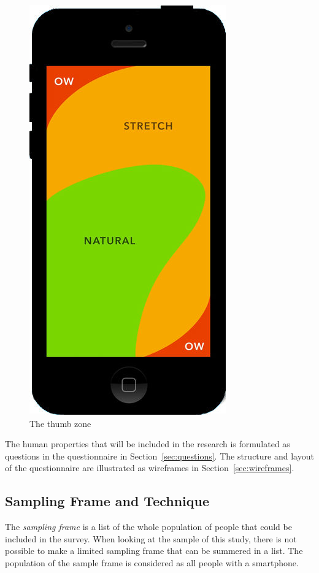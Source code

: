       \begin{figure}[H]
          \centering
          \includegraphics[scale=0.20]{pics/mobileScreen.jpg}
          \caption{The thumb zone}
          \label{fig:thumbZone}
        \end{figure}


    The human properties that will be included in the research is formulated as questions in the questionnaire in Section~\ref{sec:questions}. The structure and layout of the questionnaire are illustrated as wireframes in Section~\ref{sec:wireframes}.
    
    \subsection{Sampling Frame and Technique} \label{sec:sampling}
      
    The {\it sampling frame} is a list of the whole population of people that could be included in the survey. When looking at the sample of this study, there is not possible to make a limited sampling frame that can be summered in a list. The population of the sample frame is considered as all people with a smartphone.
      
